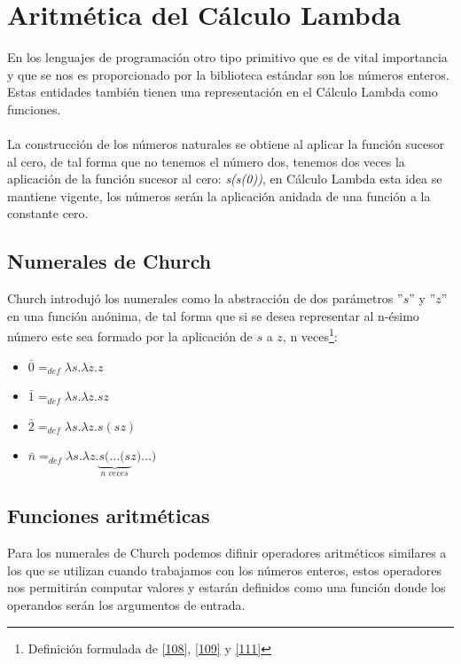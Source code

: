      \section{Aritmética del Cálculo Lambda}
        En los lenguajes de programación otro tipo primitivo que es de vital importancia y que se nos es proporcionado por la biblioteca estándar son los números enteros.
        Estas entidades también tienen una representación en el Cálculo Lambda como funciones.\\\\
        La construcción de los números naturales se obtiene al aplicar la función sucesor al cero, de tal forma que no tenemos el número dos, tenemos dos veces la aplicación de la función sucesor al cero: \textit{s(s(0))}, en Cálculo Lambda esta idea se mantiene vigente, los números serán la aplicación anidada de una función a la constante cero. 
     \subsection{Numerales de Church}
        Church introdujó los numerales como la abstracción de dos parámetros ''$s$'' y ''$z$'' en una función anónima, de tal forma que si se desea representar al n-ésimo número este sea formado por la aplicación de $s$ a $z$, n veces\footnote{Definición formulada de \hyperlink{108}{[108]},  \hyperlink{109}{[109]} y  \hyperlink{111}{[111]}}:

    \begin{itemize}
        \item $\bar{0}=_{def}\lambda s.\lambda z.z$
        \item $\bar{1}=_{def}\lambda s.\lambda z.sz$
        \item $\bar{2}=_{def}\lambda s.\lambda z.s(sz)$
        \item $\bar{n}=_{def}\lambda s.\lambda z.\underbrace{s(\ldots(s}_{n\;veces} z)\ldots)$
    \end{itemize}

    \subsection{Funciones aritméticas}
	Para los numerales de Church podemos difinir operadores aritméticos similares a los que se utilizan cuando trabajamos con los números enteros, estos operadores nos permitirán computar valores y estarán definidos como una función donde los operandos serán los argumentos de entrada.

